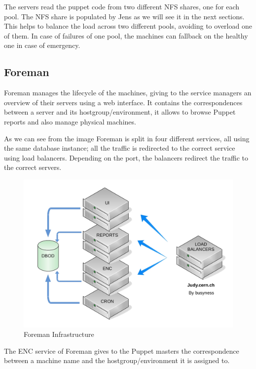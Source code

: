 The servers read the puppet code from two different NFS shares, one for
each pool. The NFS share is populated by Jens as we will see it in the
next sections. This helps to balance the load across two different pools,
avoiding to overload one of them. In case of failures of one pool, the
machines can fallback on the healthy one in case of emergency. 

\subsection{Foreman}

Foreman manages the lifecycle of the machines, giving to the service
managers an overview of their servers using a web interface. It contains
the correspondences between a server and its hostgroup/environment, it
allows to browse Puppet reports and also manage physical machines.

As we can see from the image Foreman is split in four different services,
all using the same database instance; all the traffic is redirected to the
correct service using load balancers. Depending on the port, the balancers
redirect the traffic to the correct servers.

\begin{figure}[H]
\includegraphics[width=\textwidth,height=\textheight,keepaspectratio]{ConfigurationManagement/Infrastructure_judy.jpg}
\caption{Foreman Infrastructure}
\end{figure}

The ENC service of Foreman gives to the Puppet masters the correspondence
between a machine name and the hostgroup/environment it is assigned to.

